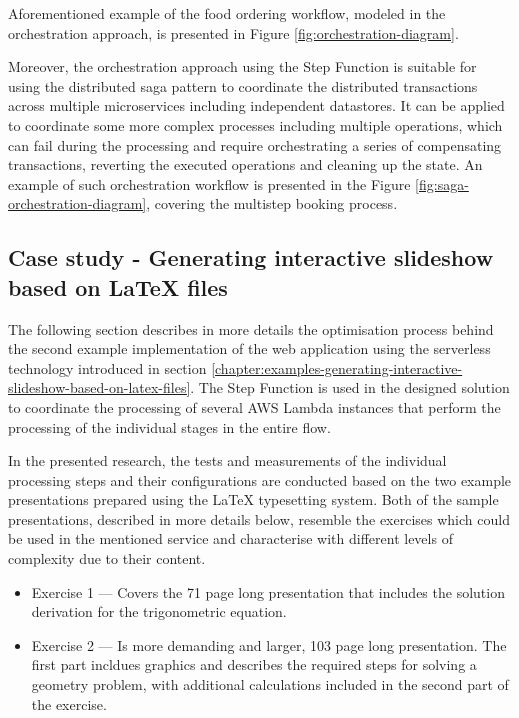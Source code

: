 Aforementioned example of the food ordering workflow, modeled in the orchestration approach, is presented in Figure \ref{fig:orchestration-diagram}.

Moreover, the orchestration approach using the Step Function is suitable for using the distributed saga pattern \cite{SagaPattern} to coordinate the distributed transactions across multiple microservices including independent datastores.
It can be applied to coordinate some more complex processes including multiple operations, which can fail during the processing and require orchestrating a series of compensating transactions, reverting the executed operations and cleaning up the state.
An example of such orchestration workflow is presented in the Figure \ref{fig:saga-orchestration-diagram}, covering the multistep booking process.

\subsection{Case study - Generating interactive slideshow based on LaTeX files} \label{chapter:latex-processing-optimisation}

The following section describes in more details the optimisation process behind the second example implementation of the web application using the serverless technology introduced in section \ref{chapter:examples-generating-interactive-slideshow-based-on-latex-files}.
The Step Function is used in the designed solution to coordinate the processing of several AWS Lambda instances that perform the processing of the individual stages in the entire flow.

In the presented research, the tests and measurements of the individual processing steps and their configurations are conducted based on the two example presentations prepared using the LaTeX typesetting system.
Both of the sample presentations, described in more details below, resemble the exercises which could be used in the mentioned service and characterise with different levels of complexity due to their content.

\begin{itemize}
   \item Exercise 1 --- Covers the 71 page long presentation that includes the solution derivation for the trigonometric equation.
   \item Exercise 2 --- Is more demanding and larger, 103 page long presentation. The first part incldues graphics and describes the required steps for solving a geometry problem, with additional calculations included in the second part of the exercise.
\end{itemize}

